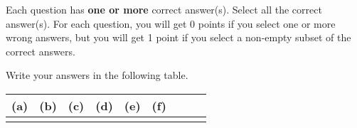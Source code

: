 
Each question has \textbf{one or more} correct answer(s). Select all the correct answer(s). For each question, you will get 0 points if you select one or more wrong answers, but you will get 1 point if you select a non-empty subset of the correct answers.

Write your answers in the following table.


\begin{table}[htbp]
	\centering
	\begin{tabular}{|p{1.7cm}|p{1.7cm}|p{1.7cm}|p{1.7cm}|p{1.7cm}|p{1.7cm}|p{1.7cm}|p{1.7cm}|p{1.7cm}|}
		\hline
		(a) & (b) & (c) & (d) & (e) & (f) \\
		\hline
		    &     &     &     &     &     \\
		\hline
	\end{tabular}
\end{table}


